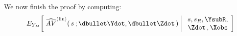 \begin{enumerate}
    \vskip 0.5cm        
    \noindent
    We now finish the proof by computing:
    \begin{eqnarray*}
    &&
        E_{Y_{M}}\!\left[\;
            \widehat{AV}^{\textnormal{(lin)}}(\,s\,;\dbullet\Ydot,\dbullet\Zdot\,)
            \,\left\vert\,
            \begin{array}{c}
                s,s_{R},\YsubR, \\ \Zdot\,,\Xobs
                \end{array}
            \right.
            \!\right]

\end{eqnarray*}
\end{enumerate}

